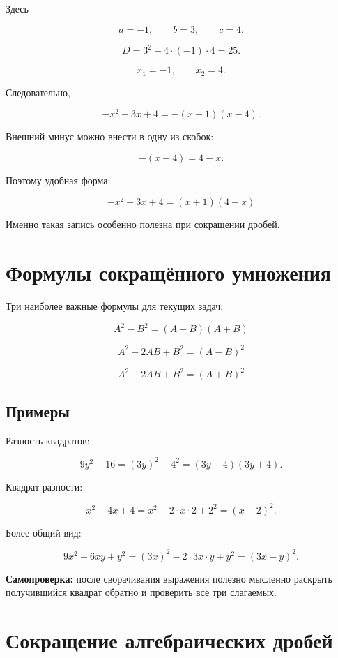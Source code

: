 \documentclass[a4paper,12pt]{article}
\newcommand{\term}[1]{\textbf{\color{darkaccent}#1}}
\begin{document}
Здесь

\[
a=-1,\qquad b=3,\qquad c=4.
\]

\[
D=3^2-4\cdot(-1)\cdot4=25.
\]

\[
x_1=-1,\qquad x_2=4.
\]

Следовательно,

\[
-x^2+3x+4
=-(x+1)(x-4).
\]

Внешний минус можно внести в одну из скобок:

\[
-(x-4)=4-x.
\]

Поэтому удобная форма:

\[
\boxed{
-x^2+3x+4=(x+1)(4-x)
}
\]

Именно такая запись особенно полезна при сокращении дробей.


\section{Формулы сокращённого умножения}

Три наиболее важные формулы для текущих задач:

\[
\boxed{
A^2-B^2=(A-B)(A+B)
}
\]

\[
\boxed{
A^2-2AB+B^2=(A-B)^2
}
\]

\[
\boxed{
A^2+2AB+B^2=(A+B)^2
}
\]

\subsection{Примеры}

Разность квадратов:

\[
9y^2-16
=(3y)^2-4^2
=\boxed{(3y-4)(3y+4)}.
\]

Квадрат разности:

\[
x^2-4x+4
=x^2-2\cdot x\cdot2+2^2
=\boxed{(x-2)^2}.
\]

Более общий вид:

\[
9x^2-6xy+y^2
=(3x)^2-2\cdot3x\cdot y+y^2
=\boxed{(3x-y)^2}.
\]

\term{Самопроверка:}
после сворачивания выражения полезно мысленно раскрыть получившийся квадрат
обратно и проверить все три слагаемых.


\section{Сокращение алгебраических дробей}
\end{document}
